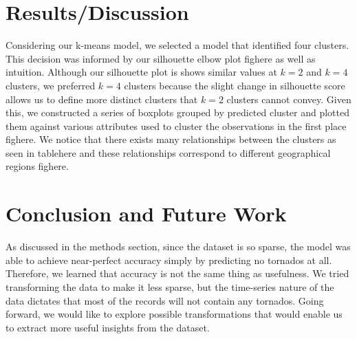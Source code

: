 \documentclass[conference]{IEEEtran}
\begin{document}
\section{Results/Discussion}

Considering our k-means model, we selected a model that identified four clusters. This decision was informed by our silhouette elbow plot fighere as well as intuition. Although our silhouette plot is shows similar values at $k = 2$ and $k =4$ clusters, we preferred $k = 4$ clusters because the slight change in silhouette score allows us to define more distinct clusters that $k  = 2$ clusters cannot convey. Given this, we constructed a series of boxplots grouped by predicted cluster and plotted them against various attributes used to cluster the observations in the first place fighere. We notice that there exists many relationships between the clusters as seen in tablehere and these relationships correspond to different geographical regions fighere.

\section{Conclusion and Future Work}

As discussed in the methods section, since the dataset is so sparse, the model was able to achieve near-perfect accuracy simply by predicting no tornados at all. Therefore, we learned that accuracy is not the same thing as usefulness. We tried transforming the data to make it less sparse, but the time-series nature of the data dictates that most of the records will not contain any tornados. Going forward, we would like to explore possible transformations that would enable us to extract more useful insights from the dataset.
\end{document}

